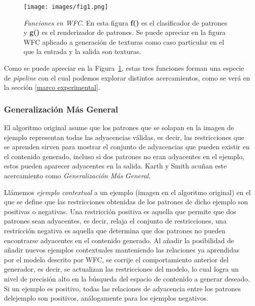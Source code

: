 \documentclass[a4paper, 10pt]{article}
\begin{document}
	\begin{figure}[h]
		\begin{center}
			\texttt{[image: images/fig1.png]}			
		\end{center}
		\caption{\textit{Funciones en WFC}. En esta figura \textbf{f()} es el clasificador
		de patrones y \textbf{g()} es el renderizador de patrones. Se puede apreciar en la figura
		WFC aplicado a generación de texturas como caso particular en el que la entrada y la
		salida son texturas.}
		\label{fig:1}	
	\end{figure}	

	Como se puede apreciar en la Figura~\ref{fig:1}, estas tres funciones forman una especie
	de \textit{pipeline} con el cual podemos explorar distintos acercamientos, como se verá en
	la sección \ref{marco experimental}.

	\subsubsection{Generalización Más General}
	El algoritmo original asume que los patrones que se solapan en la imagen de ejemplo
	representan todas las adyacencias válidas, es decir, las restricciones que se aprenden
	sirven para mostrar el conjunto de adyacencias que pueden existir en el contenido
	generado, incluso si dos patrones no eran adyacentes en el ejemplo, estos pueden
	aparecer adyacentes en la salida. Karth y Smith acuñan este acercamiento como
	\textit{Generalización Más General}\cite{bib:3}. 
	
	Llámemos \textit{ejemplo contextual} a un ejemplo (imagen en el algoritmo original) 
	en el que se define que las restricciones obtenidas de los patrones de dicho ejemplo
	son positivas o negativas. Una restricción positiva es aquella que permite que
	dos patrones sean adyacentes, es decir, relaja el conjunto de restricciones, una
	restricción negativa es aquella que determina que dos patrones no pueden 
	encontrarse adyacentes en el contenido generado. Al añadir la posibilidad de añadir
	nuevos ejemplos contextuales manteniendo las relaciones ya aprendidas por el modelo descrito por WFC,
	se corrije el comportamiento anterior del generador, es decir, se actualizan las
	restricciones del modelo, lo cual
	logra un nivel de precisión alto en la búsqueda del espacio de contenido a generar deseado.
	Si un ejemplo es positivo, todas las relaciones de adyacencia entre los patrones
	delejemplo son positivos, análogamente para los ejemplos negativos.
\end{document}
